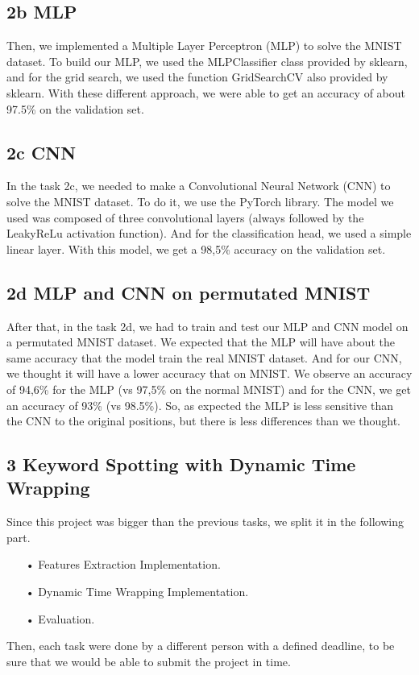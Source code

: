 \documentclass[12pt]{article}
\begin{document}
\subsection*{2b MLP}
Then, we implemented a Multiple Layer Perceptron (MLP) to solve the MNIST dataset. To build our MLP, we used the MLPClassifier class provided by sklearn, and for the grid search, we used the function GridSearchCV also provided by sklearn. With these different approach, we were able to get an accuracy of about 97.5\% on the validation set.
\subsection*{2c CNN}
In the task 2c, we needed to make a Convolutional Neural Network (CNN) to solve the MNIST dataset. To do it, we use the PyTorch library. The model we used was composed of three convolutional layers (always followed by the LeakyReLu activation function). And for the classification head, we used a simple linear layer.
With this model, we get a 98,5\% accuracy on the validation set.
\subsection*{2d MLP and CNN on permutated MNIST}
After that, in the task 2d, we had to train and test our MLP and CNN model on a permutated MNIST dataset. We expected that the MLP will have about the same accuracy that the model train  the real MNIST dataset. And for our CNN, we thought it will have a lower accuracy that on MNIST.
\newline We observe an accuracy of 94,6\% for the MLP (vs 97,5\% on the normal MNIST) and for the CNN, we get an accuracy of 93\% (vs 98.5\%). So, as expected the MLP is less sensitive than the CNN to the original positions, but there is less differences than we thought.

\subsection*{3 Keyword Spotting with Dynamic Time Wrapping}
Since this project was bigger than the previous tasks, we split it in the following part.
\begin{enumerate}
\item[•]Features Extraction Implementation.
\item[•]Dynamic Time Wrapping Implementation.
\item[•]Evaluation.
\end{enumerate}
Then, each task were done by a different person with a defined deadline, to be sure that we would be able to submit the project in time.
\end{document}

